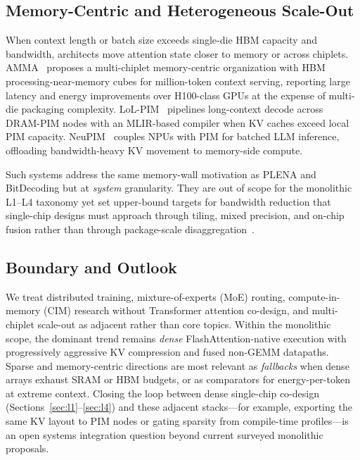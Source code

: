 \documentclass[conference]{IEEEtran}
\begin{document}
\subsection{Memory-Centric and Heterogeneous Scale-Out}
\label{sec:adjacent-memory}

When context length or batch size exceeds single-die HBM capacity and bandwidth, architects move attention state closer to memory or across chiplets.
AMMA~\cite{amma2026} proposes a multi-chiplet memory-centric organization with HBM processing-near-memory cubes for million-token context serving, reporting large latency and energy improvements over H100-class GPUs at the expense of multi-die packaging complexity.
LoL-PIM~\cite{lolpim2024} pipelines long-context decode across DRAM-PIM nodes with an MLIR-based compiler when KV caches exceed local PIM capacity.
NeuPIM~\cite{heo2024nuepim} couples NPUs with PIM for batched LLM inference, offloading bandwidth-heavy KV movement to memory-side compute.

Such systems address the same memory-wall motivation as PLENA and BitDecoding but at \emph{system} granularity.
They are out of scope for the monolithic L1--L4 taxonomy yet set upper-bound targets for bandwidth reduction that single-chip designs must approach through tiling, mixed precision, and on-chip fusion rather than through package-scale disaggregation~\cite{plena2025,bitdecoding2026,amma2026}.

\subsection{Boundary and Outlook}
\label{sec:adjacent-outlook}

We treat distributed training, mixture-of-experts (MoE) routing, compute-in-memory (CIM) research without Transformer attention co-design, and multi-chiplet scale-out as adjacent rather than core topics.
Within the monolithic scope, the dominant trend remains \emph{dense} FlashAttention-native execution with progressively aggressive KV compression and fused non-GEMM datapaths.
Sparse and memory-centric directions are most relevant as \emph{fallbacks} when dense arrays exhaust SRAM or HBM budgets, or as comparators for energy-per-token at extreme context.
Closing the loop between dense single-chip co-design (Sections~\ref{sec:l1}--\ref{sec:l4}) and these adjacent stacks---for example, exporting the same KV layout to PIM nodes or gating sparsity from compile-time profiles---is an open systems integration question beyond current surveyed monolithic proposals.
\end{document}
